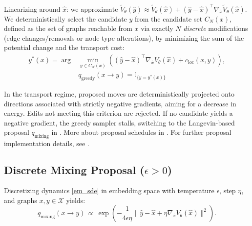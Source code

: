 Linearizing around $\hat{x}$: we approximate $\tilde{V}_\theta(\hat{y}) \approx \tilde{V}_\theta(\hat{x}) + (\hat{y} - \hat{x})^\top \nabla_{\hat{x}}\tilde{V}_\theta(\hat{x})$. We deterministically select the candidate $y$ from the candidate set $C_N(x)$, defined as the set of graphs reachable from $x$ via exactly $N$ \emph{discrete} modifications (edge changes/removals or node type alterations), by minimizing the sum of the potential change and the transport cost:
\begin{align}
y^*(x) = \arg &\min_{y \in C_N(x)}\left((\hat{y} - \hat{x})^\top\nabla_{\hat{x}} V_\theta(\hat{x}) + c_{\mathrm{loc}}(x,y)\right),\nonumber\\
&q_{\text{greedy}}(x \to y) = \mathbb{I}_{\{y=y^*(x)\}}\label{eq:greedy-proposal}
\end{align}



In the transport regime, proposed moves are deterministically projected onto directions associated with strictly negative gradients, aiming for a decrease in energy. Edits not meeting this criterion are rejected. If no candidate yields a negative gradient, the greedy sampler stalls, switching to the Langevin-based proposal $q_\mathrm{mixing}$ in . More about proposal schedules in .
 For further proposal implementation details, see .


\subsection{Discrete Mixing Proposal ($\epsilon>0$)}
\label{proposals_lang}
Discretizing dynamics \eqref{em_sde} in embedding space with temperature $\epsilon$, step $\eta$, and graphs $x,y \in \mathcal{X}$ yields:
\begin{equation}
q_{\mathrm{mixing}}(x\to y)
\,\propto\,
\exp\left(
-\frac{1}{4\epsilon\eta}\|\hat{y}-\hat{x}+\eta\nabla_{\hat{x}} V_\theta(\hat{x})\|^2
\right).
\end{equation}

